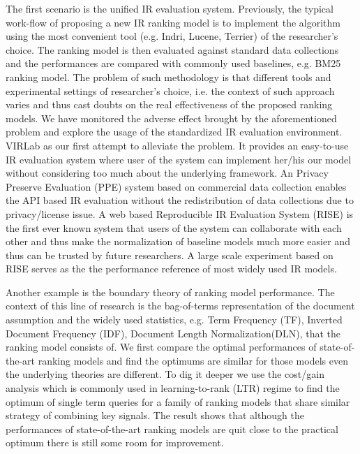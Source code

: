 The first scenario is the unified IR evaluation system. 
Previously, the typical work-flow of proposing a new IR ranking model is to 
implement the algorithm using the most convenient tool (e.g. Indri, Lucene, 
Terrier) of the researcher's choice. 
The ranking model is then evaluated against standard 
data collections and the performances are compared with commonly used 
baselines, e.g. BM25 ranking model. The problem of such methodology is that 
different tools and experimental settings of researcher's choice, i.e. the 
context of such approach varies and thus cast doubts on the real effectiveness 
of the proposed ranking models. 
We have monitored the adverse effect brought by the aforementioned problem and 
explore the usage of the standardized IR evaluation environment. 
VIRLab as our first attempt to alleviate the problem. It provides an 
easy-to-use IR evaluation system where user of the system can implement 
her/his our model without considering too much about the underlying framework. 
An Privacy Preserve Evaluation (PPE) system based on commercial data 
collection enables the API based IR evaluation without the redistribution 
of data collections due to privacy/license issue.
A web based Reproducible IR Evaluation System (RISE) is the first ever known 
system that users of the system can collaborate with each other and thus make 
the normalization of baseline models much more easier and thus can be trusted 
by future researchers. A large scale experiment based on RISE serves as the 
the performance reference of most widely used IR models.

Another example is the boundary theory of ranking model performance. 
The context of this line of research is the bag-of-terms representation of 
the document assumption and the widely used statistics, e.g. Term Frequency 
(TF), Inverted Document Frequency (IDF), Document Length Normalization(DLN), 
that the ranking model consists of. We first compare the optimal 
performances of state-of-the-art ranking models and find the optimums 
are similar for those models even the underlying theories are different. 
To dig it deeper we use the cost/gain analysis which is commonly used in 
learning-to-rank (LTR) regime to find the optimum of single term queries for 
a family of ranking models that share similar strategy of combining key 
signals. The result shows that although the performances of state-of-the-art 
ranking models are quit close to the practical optimum there is still some 
room for improvement.

